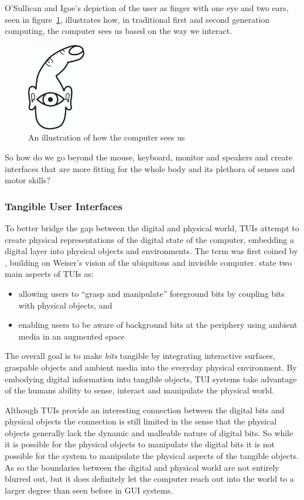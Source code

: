O'Sullican and Igoe's \citep{o2004physical} depiction of the user as finger with one eye and two ears, seen in figure~\ref{finger-eye}, illustrates how, in traditional first and second generation computing, the computer sees us based on the way we interact. 

\begin{figure}[h]
  \centering
      \includegraphics[height=1.5in]{figures/igoefinger}
  \caption{An illustration of how the computer sees us \citep{o2004physical}}
   \label{finger-eye}
\end{figure}
So how do we go beyond the mouse, keyboard, monitor and speakers and create interfaces that are more fitting for the whole body and its plethora of senses and motor skills? 

\subsubsection{Tangible User Interfaces}
To better bridge the gap between the digital and physical world, TUIs attempt to create physical representations of the digital state of the computer, embedding a digital layer into physical objects and environments.
The term was first coined by \citet{ishii1997tangible}, building on Weiser's vision of the ubiquitous and invisible computer.
\citeauthor{ishii1997tangible} state two main aspects of TUIs as:
\begin{itemize}
    \item{allowing users to ``grasp and manipulate'' foreground bits by coupling bits with physical objects, and}
    \item{enabling users to be aware of background bits at the periphery using ambient media in an augmented space}
\end{itemize}
The overall goal is to make \emph{bits} tangible by integrating interactive surfaces, graspable objects and ambient media into the everyday physical environment.
By embodying digital information into tangible objects, TUI systems take advantage of the humans ability to sense, interact and manipulate the physical world. 

Although TUIs provide an interesting connection between the digital bits and physical objects the connection is still limited in the sense that the physical objects generally lack the dynamic and malleable nature of digital bits.
So while it is possible for the physical objects to manipulate the digital bits it is not possible for the system to manipulate the physical aspects of the tangible objects.
As so the boundaries between the digital and physical world are not entirely blurred out, but it does definitely let the computer reach out into the world to a larger degree than seen before in GUI systems. 

